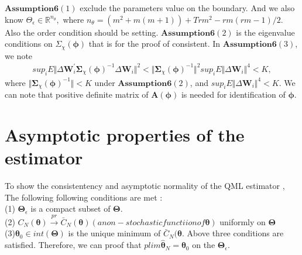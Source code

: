 \documentclass[12pt,a4paper,hyperref]{article}
\begin{document}
$\boldsymbol{Assumption 6} (1)$ exclude the parameters value on the boundary. And we  also know $\Theta_{\epsilon} \in \mathbb{R}^{n_{\theta}},$ where $n_{\theta}=(m^{2}+m(m+1))+Trm^{2}-rm(rm-1)/2$. Also the order condition should be setting.  $\boldsymbol{Assumption 6} (2)$ is the eigenvalue conditions on $\Sigma_{\chi}(\boldsymbol{\phi})$ that is for the proof of consistent. In $\boldsymbol{Assumption 6} (3)$,
we note
\begin{align}
sup_{i} E\Vert \Delta \boldsymbol{W}^{'}_{i}\boldsymbol{\Sigma}_{\chi}(\boldsymbol{\phi})^{-1}\Delta \boldsymbol{W}_{i} \Vert^{2} < \Vert \boldsymbol{\Sigma}_{\chi}(\boldsymbol{\phi})^{-1} \Vert^{2}sup_{i}E \Vert \Delta \boldsymbol{W}_{i}  \Vert^{4}< K,
\end{align}
where $ \Vert \boldsymbol{\Sigma}_{\chi}(\boldsymbol{\phi})^{-1} \Vert<K$ under $\boldsymbol{Assumption 6} (2)$, and $sup_{i} E \Vert \Delta \boldsymbol{W}_{i}  \Vert^{4}<K $. We can note that positive definite matrix of $\boldsymbol{A}(\boldsymbol{\phi})$ is needed for identification of $\boldsymbol{\phi}$.






\section{Asymptotic properties of the estimator}

To show the consistentency and asymptotic normality of the  QML estimator ,
The following following conditions are met :  \\
(1) $\boldsymbol{\Theta}_{\epsilon}$ is a compact subset of $\boldsymbol{\Theta}$. \\
(2)   $C_{N}(\boldsymbol{\theta})\overset{pr}{\to} \bar{C}_{N}(\boldsymbol{\theta})(a non-stochastic functiion of \boldsymbol{\theta} )$ uniformly on $\boldsymbol{\Theta}$ \\
(3)$\boldsymbol{\theta}_{0}\in int(\boldsymbol{\Theta})$ is the unique minimum of $\bar{C}_{N}(\boldsymbol{\theta}$. Above three conditions are satisfied. Therefore, we can proof that $plim\boldsymbol{\hat{\theta}}_{N}=\boldsymbol{\theta}_{0}$ on the $\boldsymbol{\Theta}_{\epsilon}$. \\
\end{document}

